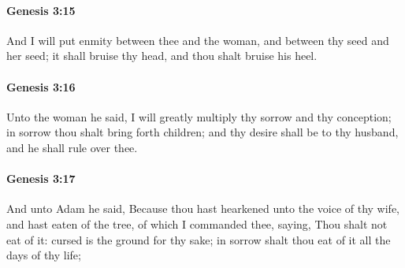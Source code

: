 		\paragraph{Genesis 3:15} %
			\label{GENESIS-3-15}

			And I will put enmity between thee and the woman, and between thy seed and her seed; it shall bruise thy head, and thou shalt bruise his heel.


		\paragraph{Genesis 3:16} %
			\label{GENESIS-3-16}

			Unto the woman he said, I will greatly multiply thy sorrow and thy conception; in sorrow thou shalt bring forth children; and thy desire shall be to thy husband, and he shall rule over thee.


		\paragraph{Genesis 3:17} %
			\label{GENESIS-3-17}

			And unto Adam he said, Because thou hast hearkened unto the voice of thy wife, and hast eaten of the tree, of which I commanded thee, saying, Thou shalt not eat of it: cursed is the ground for thy sake; in sorrow shalt thou eat of it all the days of thy life;


